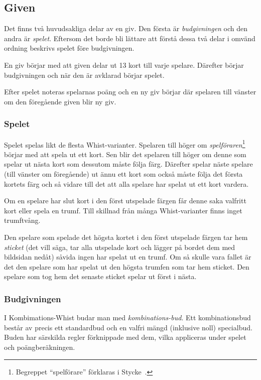 \documentclass[a4paper]{article}
\begin{document}
		\subsection{Given}
			Det finns två huvudsakliga delar av en giv. Den första är \emph{budgivningen} och den andra är \emph{spelet}. Eftersom det borde bli lättare att förstå dessa två delar i omvänd ordning beskrivs spelet före budgivningen.

			En giv börjar med att given delar ut 13 kort till varje spelare. Därefter börjar budgivningen och när den är avklarad börjar spelet.

			Efter spelet noteras spelarnas poäng och en ny giv börjar där spelaren till vänster om den föregående given blir ny giv.

			\subsubsection{Spelet}
				Spelet spelas likt de flesta Whist-varianter. Spelaren till höger om \emph{spelföraren}\footnote{Begreppet ``spelförare'' förklaras i Stycke~.} börjar med att spela ut ett kort. Sen blir det spelaren till höger om denne som spelar ut nästa kort som dessutom måste följa färg. Därefter spelar näste spelare (till vänster om föregående) ut ännu ett kort som också måste följa det första kortets färg och så vidare till det att alla spelare har spelat ut ett kort vardera.

				Om en spelare har slut kort i den först utspelade färgen får denne saka valfritt kort eller spela en trumf. Till skillnad från många Whist-varianter finns inget trumftvång.

				Den spelare som spelade det högsta kortet i den först utspelade färgen tar hem \emph{sticket} (det vill säga, tar alla utspelade kort och lägger på bordet dem med bildsidan nedåt) såvida ingen har spelat ut en trumf. Om så skulle vara fallet är det den spelare som har spelat ut den högsta trumfen som tar hem sticket. Den spelare som tog hem det senaste sticket spelar ut först i nästa.

			\subsubsection{Budgivningen}
				\label{sec:bidding}
				I Kombimations-Whist budar man med \emph{kombinations-bud}. Ett kombinationsbud består av precis ett standardbud och en valfri mängd (inklusive noll) specialbud. Buden har särskilda regler förknippade med dem, vilka appliceras under spelet och poängberäkningen.
\end{document}
